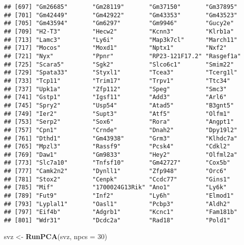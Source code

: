 \documentclass[
]{article}
\newenvironment{Shaded}{\begin{snugshade}}{\end{snugshade}}
\newcommand{\DataTypeTok}[1]{\textcolor[rgb]{0.13,0.29,0.53}{#1}}
\newcommand{\DecValTok}[1]{\textcolor[rgb]{0.00,0.00,0.81}{#1}}
\newcommand{\KeywordTok}[1]{\textcolor[rgb]{0.13,0.29,0.53}{\textbf{#1}}}
\newcommand{\NormalTok}[1]{#1}
\newcommand{\StringTok}[1]{\textcolor[rgb]{0.31,0.60,0.02}{#1}}
\begin{document}
\begin{verbatim}
## [697] "Gm26685"       "Gm28119"       "Gm37150"       "Gm37895"      
## [701] "Gm42449"       "Gm42922"       "Gm43353"       "Gm43523"      
## [705] "Gm43594"       "Gm6297"        "Gm9946"        "Gucy2e"       
## [709] "H2-T3"         "Hecw2"         "Kcnn3"         "Klrb1a"       
## [713] "Lamc3"         "Ly6i"          "Map3k7cl"      "March11"      
## [717] "Mocos"         "Moxd1"         "Nptx1"         "Nxf2"         
## [721] "Nyx"           "Ppnr"          "RP23-121F17.2" "Rasgef1a"     
## [725] "Scara5"        "Sgk2"          "Slco6c1"       "Smim22"       
## [729] "Spata33"       "Styxl1"        "Tcea3"         "Tcerg1l"      
## [733] "Tcp11"         "Trim17"        "Trpv1"         "Ttc34"        
## [737] "Upk1a"         "Zfp112"        "Speg"          "Smc3"         
## [741] "Gstp1"         "Igsf11"        "Add3"          "Arl6"         
## [745] "Spry2"         "Usp54"         "Atad5"         "B3gnt5"       
## [749] "Ier2"          "Supt3"         "Atf5"          "Olfm1"        
## [753] "Serp2"         "Sox6"          "Rora"          "Angpt1"       
## [757] "Cpn1"          "Crnde"         "Dnah2"         "Dpy19l2"      
## [761] "Dthd1"         "Gm43938"       "Grm3"          "Klhdc7a"      
## [765] "Mpzl3"         "Rassf9"        "Pcsk4"         "Cdkl2"        
## [769] "Daw1"          "Gm9833"        "Hey2"          "Olfml2a"      
## [773] "Slc7a10"       "Tnfsf10"       "Gm42727"       "Cox5b"        
## [777] "Camk2n2"       "Dynll1"        "Zfp948"        "Orc6"         
## [781] "Stox2"         "Cenpk"         "Ccdc77"        "Gins1"        
## [785] "Mif"           "1700024G13Rik" "Ano1"          "Ly6k"         
## [789] "Fut9"          "Inf2"          "Ly6h"          "Elmod1"       
## [793] "Lyplal1"       "Oasl1"         "Pcbp3"         "Aldh2"        
## [797] "Eif4b"         "Adgrb1"        "Kcnc1"         "Fam181b"      
## [801] "Wdr31"         "Dcdc2a"        "Rad18"         "Pold1"
\end{verbatim}

\begin{Shaded}
\begin{Highlighting}[]
\NormalTok{svz <-}\StringTok{ }\KeywordTok{RunPCA}\NormalTok{(svz, }\DataTypeTok{npcs =} \DecValTok{30}\NormalTok{)}
\end{Highlighting}
\end{Shaded}
\end{document}
